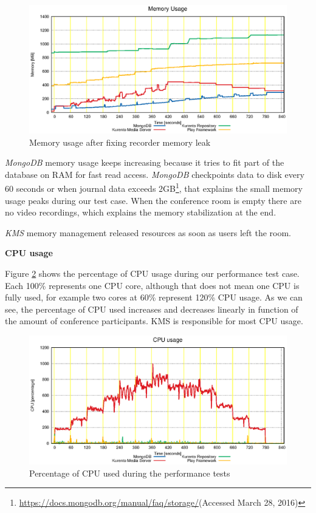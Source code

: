\documentclass[conference,compsoc,a4paper]{IEEEtran}
\begin{document}
\begin{figure}
  \centering
  \includegraphics[width=\linewidth]{stats/test_ram_fixed_mem.eps}
  \caption{Memory usage after fixing recorder memory leak}
  \label{fig:test_ram_fixed_mem}
\end{figure}

\emph{MongoDB} memory usage keeps increasing because it tries to fit part of the database on \gls{RAM} for fast read access. \emph{MongoDB} checkpoints data to disk every 60 seconds or when journal data exceeds 2GB\footnote{\url{https://docs.mongodb.org/manual/faq/storage/}(Accessed March 28, 2016)}, that explains the small memory usage peaks during our test case. When the conference room is empty there are no video recordings, which explains the memory stabilization at the end.

\emph{KMS} memory management released resources as soon as users left the room. 


\textbf{CPU usage}


Figure \ref{fig:test_full_features_cpu} shows the percentage of \gls{CPU} usage during our performance test case. Each 100\% represents one \gls{CPU} core, although that does not mean one \gls{CPU} is fully used, for example two cores at 60\% represent 120\% \gls{CPU} usage. As we can see, the percentage of \gls{CPU} used increases and decreases linearly in function of the amount of conference participants. \gls{KMS} is responsible for most \gls{CPU} usage.


\begin{figure}
  \centering
  \includegraphics[width=\linewidth]{stats/test_full_features_cpu.eps}
  \caption{Percentage of CPU used during the performance tests}
  \label{fig:test_full_features_cpu}
\end{figure}
\end{document}
